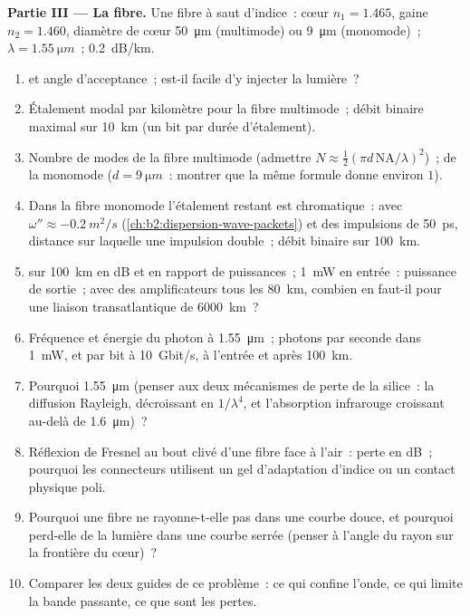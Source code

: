 \begin{problem}
\medskip
\noindent\textbf{Partie III --- La fibre.}
Une fibre à saut d'indice~: cœur $n_1 = 1.465$, gaine $n_2 = 1.460$, diamètre
de cœur \qty{50}{\micro m} (multimode) ou \qty{9}{\micro m} (monomode)~;
$\lambda = \qty{1.55}{\micro m}$~;  \qty{0.2}{dB/km}.
\begin{enumerate}[resume]
  \item {} et angle d'acceptance~; est-il facile d'y injecter
        la lumière~?
  \item Étalement modal par kilomètre pour la fibre multimode~; débit binaire
        maximal sur \qty{10}{km} (un bit par durée d'étalement).
  \item Nombre de modes de la fibre multimode (admettre $N \approx
        \tfrac12(\pi d\,\mathrm{NA}/\lambda)^2$)~; de la monomode ($d =
        \qty{9}{\micro m}$~: montrer que la même formule donne environ $1$).
  \item Dans la fibre monomode l'étalement restant est chromatique~:
        avec $\omega'' \approx \qty{-0.2}{m^2/s}$ (\cref{ch:b2:dispersion-wave-packets})
        et des impulsions de \qty{50}{ps}, distance sur laquelle une impulsion double~;
        débit binaire sur \qty{100}{km}.
  \item {} sur \qty{100}{km} en dB et en rapport de puissances~; \qty{1}{mW}
        en entrée~: puissance de sortie~; avec des amplificateurs tous les \qty{80}{km}, combien
        en faut-il pour une liaison transatlantique de \qty{6000}{km}~?
  \item Fréquence et énergie du photon à \qty{1.55}{\micro m}~; photons par
        seconde dans \qty{1}{mW}, et par bit à \qty{10}{Gbit/s}, à l'entrée
        et après \qty{100}{km}.
  \item Pourquoi \qty{1.55}{\micro m} (penser aux deux mécanismes de perte de la
        silice~: la diffusion Rayleigh, décroissant en $1/\lambda^4$, et l'absorption
        infrarouge croissant au-delà de \qty{1.6}{\micro m})~?
  \item Réflexion de Fresnel au bout clivé d'une fibre face à l'air~: perte en
        dB~; pourquoi les connecteurs utilisent un gel d'adaptation d'indice ou un contact
        physique poli.
  \item Pourquoi une fibre ne rayonne-t-elle pas dans une courbe douce, et pourquoi
        perd-elle de la lumière dans une courbe serrée (penser à l'angle du rayon
        sur la frontière du cœur)~?
  \item Comparer les deux guides de ce problème~: ce qui confine l'onde,
        ce qui limite la bande passante, ce que sont les pertes.
\end{enumerate}
\end{problem}
